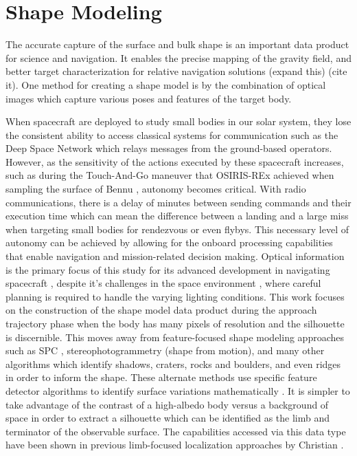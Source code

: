 \section{Shape Modeling}
The accurate capture of the surface and bulk shape is an important data product for science and navigation. It enables the precise mapping of the gravity field, and better target characterization for relative navigation solutions (expand this) (cite it). One method for creating a shape model is by the combination of optical images which capture various poses and features of the target body. 


When spacecraft are deployed to study small bodies in our solar system, they lose the consistent ability to access classical systems for communication such as the Deep Space Network which relays messages from the ground-based operators. However, as the sensitivity of the actions executed by these spacecraft increases, such as during the Touch-And-Go maneuver that OSIRIS-REx achieved when sampling the surface of Bennu \cite{Berry2013}, autonomy becomes critical. With radio communications, there is a delay of minutes between sending commands and their execution time which can mean the difference between a landing and a large miss when targeting small bodies for rendezvous or even flybys. This necessary level of autonomy can be achieved by allowing for the onboard processing capabilities that enable navigation and mission-related decision making. Optical information is the primary focus of this study for its advanced development in navigating spacecraft \cite{Owen2011}, despite it's challenges in the space environment \cite{DellaGiustina2018}, where careful planning is required to handle the varying lighting conditions. This work focuses on the construction of the shape model data product during the approach trajectory phase when the body has many pixels of resolution and the silhouette is discernible. This moves away from feature-focused shape modeling approaches such as SPC \cite{Gaskell2008}, stereophotogrammetry (shape from motion)\cite{Hartley2000}, and many other algorithms which identify shadows, craters, rocks and boulders, and even ridges in order to inform the shape. These alternate methods use specific feature detector algorithms to identify surface variations mathematically \cite{Lowe2004}. It is simpler to take advantage of the contrast of a high-albedo body versus a background of space in order to extract a silhouette which can be identified as the limb and terminator of the observable surface. The capabilities accessed via this data type have been shown in previous limb-focused localization approaches by Christian \cite{Christian2017}. 

